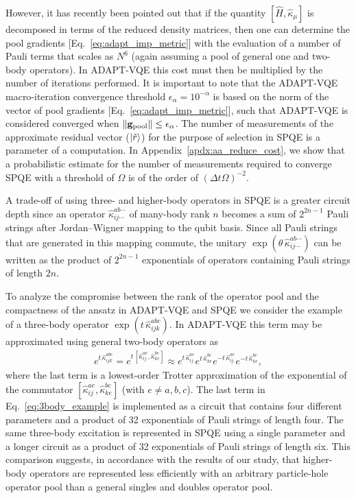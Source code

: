 \documentclass[aps,prx, reprint]{revtex4-2}
\providecommand{\normnorm}[1]{\lVert#1\rVert}
\begin{document}
However, it has recently been pointed out \cite{liu2020efficient} that if the quantity $[ \hat{H}, \hat{\kappa}_\mu ]$ is decomposed in terms of the reduced density matrices, then one can determine the pool gradients [Eq.~\eqref{eq:adapt_imp_metric}] with the evaluation of a number of Pauli terms that scales as $N^6$ (again assuming a pool of general one and two-body operators).
In ADAPT-VQE this cost must then be multiplied by the number of iterations performed.
It is important to note that the ADAPT-VQE macro-iteration convergence threshold $\epsilon_\alpha = 10^{-\alpha}$ is based on the norm of the vector of pool gradients [Eq.~\eqref{eq:adapt_imp_metric}], such that ADAPT-VQE is considered converged when $\normnorm{\mathbf{g}_{\rm{pool}}}  \leq \epsilon_\alpha$.
The number of measurements of the approximate residual vector ($\ket{\tilde{r}}$) for the purpose of selection in SPQE is a parameter of a computation. In Appendix~\ref{apdx:aa_reduce_cost}, we show that a probabilistic estimate for the number of measurements required to converge SPQE with a threshold of $\Omega$ is of the order of $(\Delta t \Omega )^{-2}$.

A  trade-off of using three- and higher-body operators in SPQE is a greater circuit depth since an operator $\hat{\kappa}_{ij\cdots}^{ab\cdots}$ of many-body rank $n$ becomes  a sum of $2^{2n -1}$ Pauli strings after Jordan--Wigner mapping to the qubit basis.
Since all Pauli strings that are generated in this mapping commute, the unitary $\exp(\theta \, \hat{\kappa}_{ij\cdots}^{ab\cdots})$ can be written as the product of $2^{2n -1}$ exponentials of operators containing Pauli strings of length $2n$.

To analyze the compromise between the rank of the operator pool and the compactness of the ansatz in ADAPT-VQE and SPQE we consider the example of a three-body operator $\exp(t \, \hat{\kappa}_{ijk}^{abc})$.
In ADAPT-VQE this term may be approximated using general two-body operators as
\begin{equation}
\label{eq:3body_example}
\begin{split}
e^{t \, \hat{\kappa}_{ijk}^{abc}}
=
e^{t \, [\hat{\kappa}_{ij}^{ae},\hat{\kappa}_{ke}^{bc}]}
\approx
e^{t \, \hat{\kappa}_{ij}^{ae}}
e^{t \, \hat{\kappa}_{ke}^{bc}}
e^{-t \,\hat{\kappa}_{ij}^{ae}}
e^{-t \, \hat{\kappa}_{ke}^{bc}},
\end{split}
\end{equation}
where the last term is a lowest-order Trotter approximation of the exponential of the commutator $[\hat{\kappa}_{ij}^{ae},\hat{\kappa}_{ke}^{bc}]$ (with $e \neq a,b,c$).
The last term in Eq.~\eqref{eq:3body_example} is implemented as a circuit that contains four different parameters and a product of 32 exponentials of Pauli strings of length four.
The same three-body excitation is represented in SPQE using a single parameter and a longer circuit as a product of 32 exponentials of Pauli strings of length six.
This comparison suggests, in accordance with the results of our study, that higher-body operators are represented less efficiently with an arbitrary particle-hole operator pool than a general singles and doubles operator pool.
\end{document}
